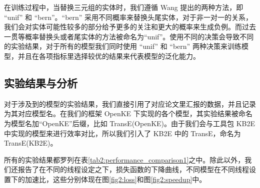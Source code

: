 在训练过程中，当替换三元组的实体时，我们遵循 Wang \cite{wang2014transh} 提出的两种方法，即 ``unif'' 和 ``bern''。``bern'' 采用不同概率来替换头尾实体，对于非一对一的关系，我们会对实体可能性较多的部分给予更多的关注和更大的概率来生成负例。而过去一贯等概率替换头或者尾实体的方法被命名为``unif''。使用不同的决策会导致不同的实验结果，对于所有的模型我们同时使用 ``unif'' 和 ``bern'' 两种决策来训练模型，并且在各项指标里选择较优的结果来代表模型的泛化能力。

\subsection{实验结果与分析}

对于涉及到的模型的实验结果，我们直接引用了对应论文里汇报的数据，并且记录为其对应模型名。在我们的框架 OpenKE 下实现的各个模型，其实验结果被命名为模型名加``OpenKE''后缀，比如 TransE(OpenKE)。由于我们会与工具包 KB2E 中实现的模型来进行效率对比，所以我们引入了 KB2E 中的 TransE，命名为 TransE(KB2E)。

所有的实验结果都罗列在表\ref{tab2:performance_comparison1}之中。除此以外，我们还报告了在不同的线程设定之下，损失函数的下降曲线，不同模型在不同线程设置下的加速比，这些分别体现在图\ref{fig2:loss}和图\ref{fig2:speedup}中。



\begin{table}[h]  
  \centering  
  \caption{WN18、FB15K上链接预测结果}  
  \label{tab2:performance_comparison1}  
\end{table}

